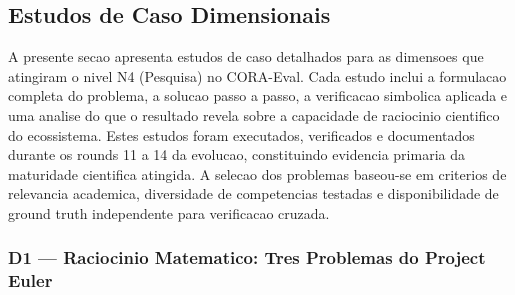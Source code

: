 ﻿%


\subsection{Estudos de Caso Dimensionais}

A presente secao apresenta estudos de caso detalhados para as dimensoes
que atingiram o nivel N4 (Pesquisa) no CORA-Eval. Cada estudo inclui
a formulacao completa do problema, a solucao passo a passo, a verificacao
simbolica aplicada e uma analise do que o resultado revela sobre a
capacidade de raciocinio cientifico do ecossistema. Estes estudos foram
executados, verificados e documentados durante os rounds 11 a 14 da
evolucao, constituindo evidencia primaria da maturidade cientifica
atingida. A selecao dos problemas baseou-se em criterios de relevancia
academica, diversidade de competencias testadas e disponibilidade de
ground truth independente para verificacao cruzada.

\subsubsection{D1 --- Raciocinio Matematico: Tres Problemas do Project Euler}

